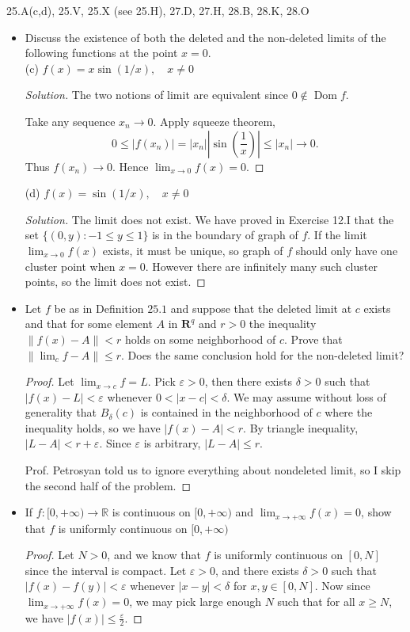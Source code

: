 25.A(c,d), 25.V, 25.X (see 25.H), 27.D, 27.H, 28.B, 28.K, 28.O

\begin{itemize}
	\item [25.A.] Discuss the existence of both the deleted and the non-deleted limits of the following functions at the point $x=0$.\\
(c) $f(x)=x \sin (1 / x), \quad x \neq 0$
\begin{proof}[Solution]
	The two notions of limit are equivalent since $0 \not\in  \operatorname{Dom} f$. 

	Take any sequence $x_n \to 0$. Apply squeeze theorem,
	\[
		0\le |f(x_n)| = |x_n| |\sin(\frac{1}{x})| \le |x_n| \to 0
	.\] 
	Thus $f(x_n) \to 0$. Hence $\lim_{x \to 0} f(x) = 0$.
\end{proof}
(d) $f(x)=\sin (1 / x), \quad x \neq 0$
\begin{proof}[Solution]
	The limit does not exist. We have proved in Exercise 12.I that the set $\{(0,y): -1\le y\le 1\} $ is in the boundary of graph of $f$. If the limit $\lim_{x \to 0} f(x)$ exists, it must be unique, so graph of $f$ should only have one cluster point when $x = 0$. However there are infinitely many such cluster points, so the limit does not exist.
\end{proof}

\item [25.V.] Let $f$ be as in Definition $25.1$ and suppose that the deleted limit at $c$ exists and that for some element $A$ in $\mathbf{R}^q$ and $r>0$ the inequality $\|f(x)-A\|<r$ holds on some neighborhood of $c$. Prove that $\left\|\lim _c f-A\right\| \leq r$. Does the same conclusion hold for the non-deleted limit?
\begin{proof}
	Let $\lim_{x \to c} f = L$. Pick $\varepsilon>0$, then there exists $\delta>0$ such that $|f(x) - L| < \varepsilon$ whenever $0<|x - c| < \delta$. We may assume without loss of generality that $B_\delta(c)$ is contained in the neighborhood of $c$ where the inequality holds, so we have $|f(x) - A | < r$. By triangle inequality, $|L - A| < r + \varepsilon$. Since $\varepsilon$ is arbitrary, $|L - A| \le r$.

	Prof. Petrosyan told us to ignore everything about nondeleted limit, so I skip the second half of the problem.
\end{proof}

\item [25.X.] If $f:[0,+\infty) \rightarrow \mathbb{R}$ is continuous on $[0,+\infty)$ and $\lim _{x \rightarrow+\infty} f(x)=0$, show that $f$ is uniformly continuous on $[0,+\infty)$
\begin{proof}
	Let $N> 0$, and we know that $f$ is uniformly continuous on $[0,N]$ since the interval is compact. Let $\varepsilon>0$, and there exists $\delta>0$ such that $|f(x) - f(y)| < \varepsilon$ whenever $|x - y| < \delta$ for $x, y \in [0,N]$. Now since $\lim_{x \to +\infty} f(x) = 0$, we may pick large enough $N$ such that for all $x \ge  N$, we have $|f(x)| \le  \frac{\varepsilon}{2}$. 


\end{proof}
\end{itemize}

